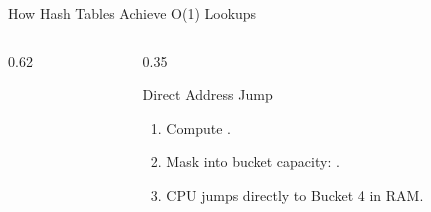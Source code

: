 \begin{frame}{How Hash Tables Achieve O(1) Lookups}
  \begin{columns}[c,onlytextwidth]
    \begin{column}{0.62\textwidth}
      \centering
    \end{column}
    \begin{column}{0.35\textwidth}
      \begin{ConceptBox}{Direct Address Jump}
        \scriptsize
        \begin{enumerate}\setlength{\itemsep}{0.08cm}
          \item Compute .
          \item Mask into bucket capacity: .
          \item CPU jumps directly to Bucket 4 in RAM.
        \end{enumerate}
      \end{ConceptBox}
      \vspace{0.10cm}
    \end{column}
  \end{columns}
\end{frame}

